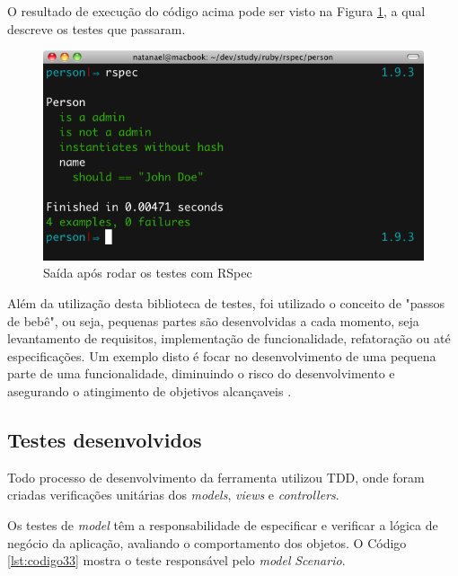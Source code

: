 O resultado de execução do código acima pode ser visto na Figura \ref{figura_31}, a qual descreve os testes que passaram.

\begin{figure}[ht]
    \centering
    \includegraphics[width=0.9 \textwidth]{figuras/figura_31}
    \caption{Saída após rodar os testes com RSpec}
    \label{figura_31}
\end{figure}

Além da utilização desta biblioteca de testes, foi utilizado o conceito de "passos de bebê", ou seja, pequenas partes são desenvolvidas a cada momento, seja levantamento de requisitos, implementação de funcionalidade, refatoração ou até especificações. Um exemplo disto é focar no desenvolvimento de uma pequena parte de uma funcionalidade, diminuindo o risco do desenvolvimento e asegurando o atingimento de objetivos alcançaveis \cite{RODRIGO}.

\subsection{Testes desenvolvidos}

Todo processo de desenvolvimento da ferramenta utilizou TDD, onde foram criadas verificações unitárias dos \textit{models}, \textit{views} e \textit{controllers}.

Os testes de \textit{model} têm a responsabilidade de especificar e verificar a lógica de negócio da aplicação, avaliando o comportamento dos objetos. O Código \ref{lst:codigo33} mostra o teste responsável pelo \textit{model} \textit{Scenario}.

